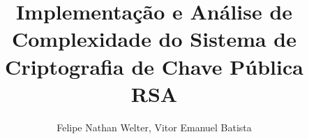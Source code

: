 \title{Implementação e Análise de Complexidade do Sistema de Criptografia de Chave Pública RSA}

\author{Felipe Nathan Welter, Vitor Emanuel Batista }

\address{Centro de Ciências Tecnológicas -- Universidade do Estado de Santa Catarina
  (UDESC)\\
  89.219-710 -- Joinville -- SC -- Brazil
}